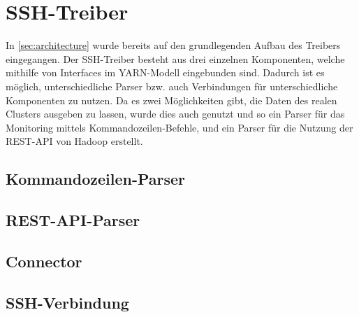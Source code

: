 \section{SSH-Treiber}\label{sec:sshDriver}

In \autoref{sec:architecture} wurde bereits auf den grundlegenden Aufbau des Treibers eingegangen. Der SSH-Treiber besteht aus drei einzelnen Komponenten, welche mithilfe von Interfaces im YARN-Modell eingebunden sind. Dadurch ist es möglich, unterschiedliche Parser bzw. auch Verbindungen für unterschiedliche Komponenten zu nutzen. Da es zwei Möglichkeiten gibt, die Daten des realen Clusters ausgeben zu lassen, wurde dies auch genutzt und so ein Parser für das Monitoring mittels Kommandozeilen-Befehle, und ein Parser für die Nutzung der REST-API von Hadoop erstellt.

\subsection{Kommandozeilen-Parser}\label{sec:cmdParser}

\subsection{REST-API-Parser}\label{sec:restParser}

\subsection{Connector}\label{sec:Connector}

\subsection{SSH-Verbindung}\label{sec:sshConnection}
